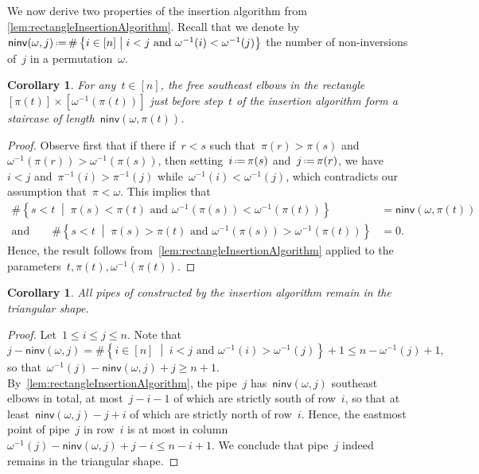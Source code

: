 \documentclass[reqno]{amsart}
\newtheorem{corollary}[theorem]{Corollary}
\theoremstyle{definition}
\newcommand{\set}[2]{\left\{ #1 \;\middle|\; #2 \right\}} %
\newcommand{\eqdef}{\mbox{\,\raisebox{0.2ex}{\scriptsize\ensuremath{\mathrm:}}\ensuremath{=}\,}} %
\newcommand{\noninversions}[2]{\mathsf{ninv}(#1,#2)} %
\begin{document}
We now derive two properties of the insertion algorithm from \cref{lem:rectangleInsertionAlgorithm}.
Recall that we denote by~$\noninversions{\omega}{j} \eqdef \#\set{i \in [n]}{i < j \text{ and } \omega^{-1}(i) < \omega^{-1}(j)}$ the number of non-inversions of~$j$ in a permutation~$\omega$.

\begin{corollary}
\label{coro:rectangleInsertionAlgorithm1}
For any~$t \in [n]$, the free southeast elbows in the rectangle~$[\pi(t)] \times [\omega^{-1}(\pi(t))]$ just before step~$t$ of the insertion algorithm form a staircase of length~$\noninversions{\omega}{\pi(t)}$.
\end{corollary}

\begin{proof}
Observe first that if there if~$r < s$ such that~$\pi(r) > \pi(s)$ and~$\omega^{-1}(\pi(r)) > \omega^{-1}(\pi(s))$, then setting~$i \eqdef \pi(s)$ and~$j \eqdef \pi(r)$, we have~${i < j}$ and~$\pi^{-1}(i) > \pi^{-1}(j)$ while~$\omega^{-1}(i) < \omega^{-1}(j)$, which contradicts our assumption that~$\pi < \omega$.
This implies that
\begin{align*}
\# \set{s < t}{\pi(s) < \pi(t) \text{ and } \omega^{-1}(\pi(s)) < \omega^{-1}(\pi(t))} & = \noninversions{\omega}{\pi(t)} \\
\text{and}\qquad \# \set{s < t}{\pi(s) > \pi(t) \text{ and } \omega^{-1}(\pi(s)) > \omega^{-1}(\pi(t))} & = 0.
\end{align*}
Hence, the result follows from~\cref{lem:rectangleInsertionAlgorithm} applied to the parameters~$t, \pi(t), \omega^{-1}(\pi(t))$.
\end{proof}

\begin{corollary}
\label{coro:rectangleInsertionAlgorithm2}
All pipes of constructed by the insertion algorithm remain in the triangular shape.
\end{corollary}

\begin{proof}
Let~$1 \le i \le j \le n$.
Note that
\[
j - \noninversions{\omega}{j} = \#\set{i \in [n]}{i < j \text{ and } \omega^{-1}(i) > \omega^{-1}(j)} + 1 \le n - \omega^{-1}(j) + 1,
\]
so that~$\omega^{-1}(j) - \noninversions{\omega}{j} + j \ge n + 1$.
By~\cref{lem:rectangleInsertionAlgorithm}, the pipe~$j$ has~$\noninversions{\omega}{j}$ southeast elbows in total, at most~$j-i-1$ of which are strictly south of row~$i$, so that at least~$\noninversions{\omega}{j} - j + i$ of which are strictly north of row~$i$.
Hence, the eastmost point of pipe~$j$ in row~$i$ is at most in column~$\omega^{-1}(j) - \noninversions{\omega}{j} + j - i \le n - i + 1$.
We conclude that pipe~$j$ indeed remains in the triangular shape.
\end{proof}
\end{document}
